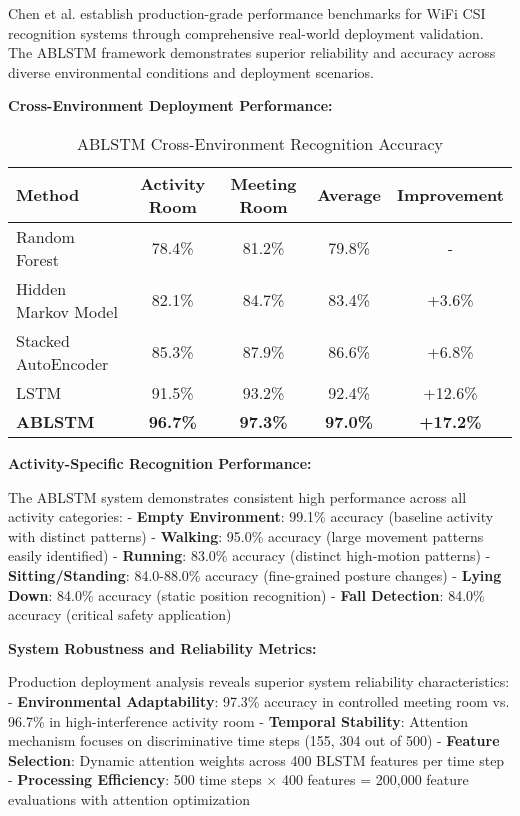 \documentclass[journal]{IEEEtran}
\begin{document}
{Chen et al. \cite{chen2018wifi} establish production-grade performance benchmarks for WiFi CSI recognition systems through comprehensive real-world deployment validation. The ABLSTM framework demonstrates superior reliability and accuracy across diverse environmental conditions and deployment scenarios.

\textbf{Cross-Environment Deployment Performance:}

\begin{table}[h]
\centering
\begin{tabular}{|l|c|c|c|c|}
\hline
\textbf{Method} & \textbf{Activity Room} & \textbf{Meeting Room} & \textbf{Average} & \textbf{Improvement} \\
\hline
Random Forest & 78.4\% & 81.2\% & 79.8\% & - \\
Hidden Markov Model & 82.1\% & 84.7\% & 83.4\% & +3.6\% \\
Stacked AutoEncoder & 85.3\% & 87.9\% & 86.6\% & +6.8\% \\
LSTM & 91.5\% & 93.2\% & 92.4\% & +12.6\% \\
\textbf{ABLSTM} & \textbf{96.7\%} & \textbf{97.3\%} & \textbf{97.0\%} & \textbf{+17.2\%} \\
\hline
\end{tabular}
\caption{ABLSTM Cross-Environment Recognition Accuracy}
\label{tab:ablstm_environment}
\end{table}

\textbf{Activity-Specific Recognition Performance:}

The ABLSTM system demonstrates consistent high performance across all activity categories:
- \textbf{Empty Environment}: 99.1\% accuracy (baseline activity with distinct patterns)
- \textbf{Walking}: 95.0\% accuracy (large movement patterns easily identified)
- \textbf{Running}: 83.0\% accuracy (distinct high-motion patterns)
- \textbf{Sitting/Standing}: 84.0-88.0\% accuracy (fine-grained posture changes)
- \textbf{Lying Down}: 84.0\% accuracy (static position recognition)
- \textbf{Fall Detection}: 84.0\% accuracy (critical safety application)

\textbf{System Robustness and Reliability Metrics:}

Production deployment analysis reveals superior system reliability characteristics:
- \textbf{Environmental Adaptability}: 97.3\% accuracy in controlled meeting room vs. 96.7\% in high-interference activity room
- \textbf{Temporal Stability}: Attention mechanism focuses on discriminative time steps (155, 304 out of 500)
- \textbf{Feature Selection}: Dynamic attention weights across 400 BLSTM features per time step
- \textbf{Processing Efficiency}: 500 time steps × 400 features = 200,000 feature evaluations with attention optimization

}
\end{document}
